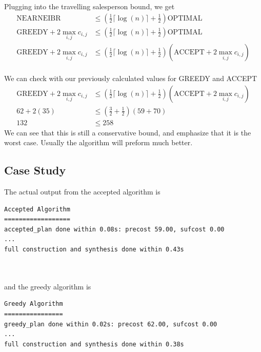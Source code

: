 Plugging into the travelling salesperson bound, we get
\begin{align*}
\text{NEARNEIBR} &\leq (\frac{1}{2} \lceil \log(n) \rceil + \frac{1}{2}) \text{OPTIMAL} \\
\text{GREEDY} + 2\max_{i,j} c_{i,j} &\leq (\frac{1}{2} \lceil \log(n) \rceil + \frac{1}{2}) \text{OPTIMAL} \\
\text{GREEDY} + 2\max_{i,j} c_{i,j} &\leq (\frac{1}{2} \lceil \log(n) \rceil + \frac{1}{2}) (\text{ACCEPT} + 2 \max_{i,j} c_{i,j}) \\ 
\end{align*} 


We can check with our previously calculated values for GREEDY and ACCEPT
\begin{align*}
\text{GREEDY} + 2\max_{i,j} c_{i,j} &\leq (\frac{1}{2} \lceil \log(n) \rceil + \frac{1}{2}) (\text{ACCEPT} + 2 \max_{i,j} c_{i,j}) \\ 
62 + 2 (35) &\leq (\frac{3}{2} + \frac{1}{2})(59+70) \\
132 &\leq 258
\end{align*}
We can see that this is still a conservative bound, and emphasize that it is the worst case. Usually the algorithm will preform much better.

\subsection{Case Study}
The actual output from the accepted algorithm is \\


\begin{minipage}{\textwidth}
\begingroup
\fontsize{9pt}{12pt}\selectfont
\begin{lstlisting}
Accepted Algorithm
==================
accepted_plan done within 0.08s: precost 59.00, sufcost 0.00
...
full construction and synthesis done within 0.43s 
\end{lstlisting}
\endgroup
\end{minipage} \\ \\


and the greedy algorithm is \\


\begin{minipage}{\textwidth}
\begingroup
\fontsize{9pt}{12pt}\selectfont
\begin{lstlisting}
Greedy Algorithm
================
greedy_plan done within 0.02s: precost 62.00, sufcost 0.00
...
full construction and synthesis done within 0.38s 
\end{lstlisting}
\endgroup
\end{minipage} \\ \\


